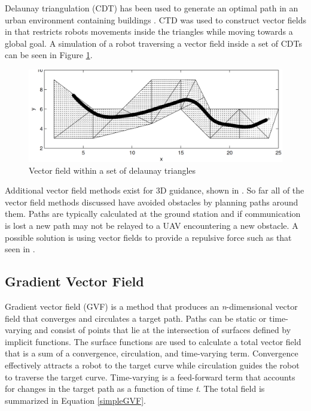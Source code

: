 \documentclass[numbered,pdftex]{ohio-etd}
\begin{document}
\cite{wwc} Delaunay triangulation (CDT) has been used to generate an optimal path in an urban environment containing buildings \cite{md_simplex_2017}. CTD was used to construct vector fields in \cite{pimenta_fully_2007} that restricts robots movements inside the triangles while moving towards a global goal. A simulation of a robot traversing a vector field inside a set of CDTs can be seen in Figure \ref{fig:cdtVF}.

\begin{figure}
	\centering
	\includegraphics[width=15cm]{PaperFigures/cdtVF}
	\caption{Vector field within a set of \cite{wwc} delaunay triangles \cite{pimenta_fully_2007}}
	\label{fig:cdtVF}
\end{figure}

Additional vector field methods exist for 3D guidance, shown in \cite{meenakshisundaram_vector_2010,miao_orthogonal_2016,goncalves_circulation_2010}.
So far all of the vector field methods discussed have avoided obstacles by planning paths around them. Paths are typically calculated at the ground station and if communication is lost a new path may not be relayed to a UAV encountering a new obstacle. A possible solution is using vector fields to provide a repulsive force such as that seen in \cite{zhou_vector_2014,panagou_motion_2014,wwc}.


\subsection{Gradient Vector Field}
Gradient vector field (GVF) is a method that produces an \textit{n}-dimensional vector field that converges and circulates a target path\cite{goncalves_artificial_2009}. Paths can be static or time-varying and consist of points that lie at the intersection of surfaces defined by implicit functions. The surface functions are used to calculate a total vector field that is a sum of a convergence, circulation, and time-varying term. Convergence effectively attracts a robot to the target curve while circulation guides the robot to traverse the target curve. Time-varying is a feed-forward term that accounts for changes in the target path as a function of time \textit{t}. The total field is summarized in Equation \ref{simpleGVF}.
\end{document}
